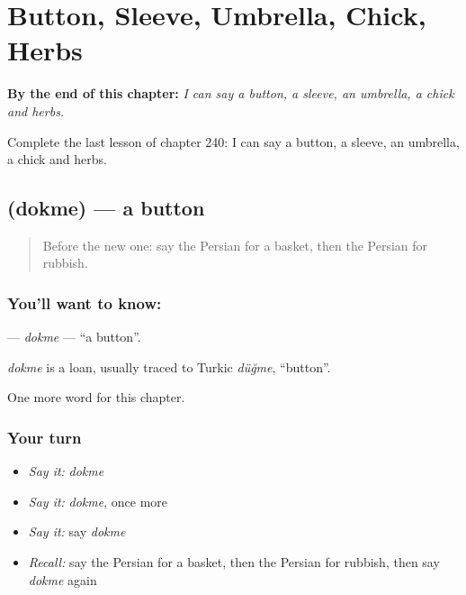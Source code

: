 
\chapter{Button, Sleeve, Umbrella, Chick, Herbs}
\label{ch:fa-button-sleeve-umbrella-chick-herbs}

\begin{chapteropening}
\textbf{By the end of this chapter:} \emph{I can say a button, a sleeve, an umbrella, a chick and herbs.}

Complete the last lesson of chapter 240: I can say a button, a sleeve, an umbrella, a chick and herbs.
\end{chapteropening}

\section[\texorpdfstring{\fa{دکمه} (dokme)}{دکمه (dokme)}]{ (dokme) — a button}

\label{lesson:FA-C240-dokme}



\begin{quote}
Before the new one: say the Persian for a basket, then the Persian for rubbish.
\end{quote}

\subsection*{You'll want to know: }
\textbf{} — \emph{dokme} — \textquotedblleft{}a button\textquotedblright{}.

\begin{cousinweb}
\emph{dokme} is a loan, usually traced to Turkic \emph{düğme}, \textquotedblleft{}button\textquotedblright{}.
\end{cousinweb}

\begin{grammarlens}[title={What you've built}]
One more word for this chapter.
\end{grammarlens}

\subsection*{Your turn}
\begin{itemize}
\raggedright
  \item \emph{Say it:} \emph{dokme}
  \item \emph{Say it:} \emph{dokme}, once more
  \item \emph{Say it:} say \emph{dokme}
  \item \emph{Recall:} say the Persian for a basket, then the Persian for rubbish, then say \emph{dokme} again
\end{itemize}

